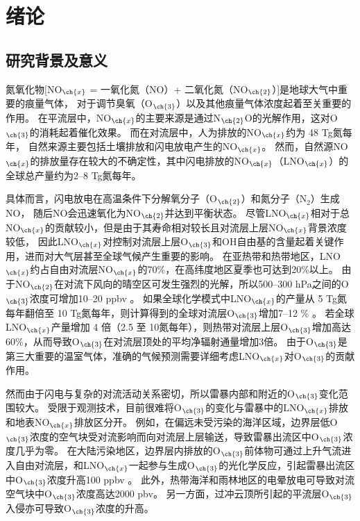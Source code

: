 
\chapter{绪论}

\section{研究背景及意义}

氮氧化物[NO$_{\ch{x}}$ = 一氧化氮（NO）+ 二氧化氮（NO$_{\ch{2}}$）]是地球大气中重要的痕量气体，
对于调节臭氧（O$_{\ch{3}}$）以及其他痕量气体浓度起着至关重要的作用。
在平流层中，NO$_{\ch{x}}$的主要来源是通过N$_{\ch{2}}$O的光解作用，这对O$_{\ch{3}}$的消耗起着催化效果。
而在对流层中，人为排放的NO$_{\ch{x}}$约为 48 Tg氮每年\citep{Miyazaki.2017}，
自然来源主要包括土壤排放和闪电放电产生的NO$_{\ch{x}}$\citep{Finlayson-PittsBarbaraJ..2000,Vinken.2014}。
然而，自然源NO$_{\ch{x}}$的排放量存在较大的不确定性，其中闪电排放的NO$_{\ch{x}}$（LNO$_{\ch{x}}$）的全球总产量约为2--8 Tg氮每年\citep{Schumann.2007}。

具体而言，闪电放电在高温条件下分解氧分子（O$_{\ch{2}}$）和氮分子（N$_2$）生成NO，
随后NO会迅速氧化为NO$_{\ch{2}}$并达到平衡状态\citep{Zeldovich.1967}。
尽管LNO$_{\ch{x}}$相对于总NO$_{\ch{x}}$的贡献较小，但是由于其寿命相对较长且对流层上层NO$_{\ch{x}}$背景浓度较低，
因此LNO$_{\ch{x}}$对控制对流层上层O$_{\ch{3}}$和OH自由基的含量起着关键作用，进而对大气层甚至全球气候产生重要的影响\citep{Levy.1996}。
在亚热带和热带地区，LNO$_{\ch{x}}$约占自由对流层NO$_{\ch{x}}$的70\%，在高纬度地区夏季也可达到20\%以上\citep{Jourdain.2001,Martin.2002,Galloway.2004,Allen.2010}。
由于NO$_{\ch{2}}$在对流下风向的晴空区可发生强烈的光解，所以500--300 hPa之间的O$_{\ch{3}}$浓度可增加10--20 ppbv \citep{DeCaria.2005,Hauglustaine.2001}。
如果全球化学模式中LNO$_{\ch{x}}$的产量从 5 Tg氮每年翻倍至 10 Tg氮每年，则计算得到的全球对流层O$_{\ch{3}}$增加7--12 \% \citep{Brasseur.1996,Labrador.2005}。
若全球LNO$_{\ch{x}}$产量增加 4 倍（2.5 至 10氮每年），则热带对流层上层O$_{\ch{3}}$增加高达60\%，从而导致O$_{\ch{3}}$在对流层顶处的平均净辐射通量增加3倍。
由于O$_{\ch{3}}$是第三大重要的温室气体，准确的气候预测需要详细考虑LNO$_{\ch{x}}$对O$_{\ch{3}}$的贡献作用。

然而由于闪电与复杂的对流活动关系密切，所以雷暴内部和附近的O$_{\ch{3}}$变化范围较大。
受限于观测技术，目前很难将O$_{\ch{3}}$的变化与雷暴中的LNO$_{\ch{x}}$排放和地表NO$_{\ch{x}}$排放区分开\citep{Schultz.2004}。
例如，在偏远未受污染的海洋区域，边界层低O$_{\ch{3}}$浓度的空气块受对流影响而向对流层上层输送，导致雷暴出流区中O$_{\ch{3}}$浓度几乎为零\citep{Kley.1996a,Folkins.2002}。
在大陆污染地区，边界层内排放的O$_{\ch{3}}$前体物可通过上升气流进入自由对流层，和LNO$_{\ch{x}}$一起参与生成O$_{\ch{3}}$的光化学反应，引起雷暴出流区中O$_{\ch{3}}$浓度升高100 ppbv \citep{Pickering.1990,Pickering.1996,Bond.2002,Huntrieser.2016a}。
此外，热带海洋和雨林地区的电晕放电可导致对流空气块中O$_{\ch{3}}$浓度高达2000 pbv\citep{Zahn.2002,Minschwaner.2008,Bozem.2014,Kotsakis.2017}。
另一方面，过冲云顶所引起的平流层O$_{\ch{3}}$入侵亦可导致O$_{\ch{3}}$浓度的升高\citep{Homeyer.2014}。

